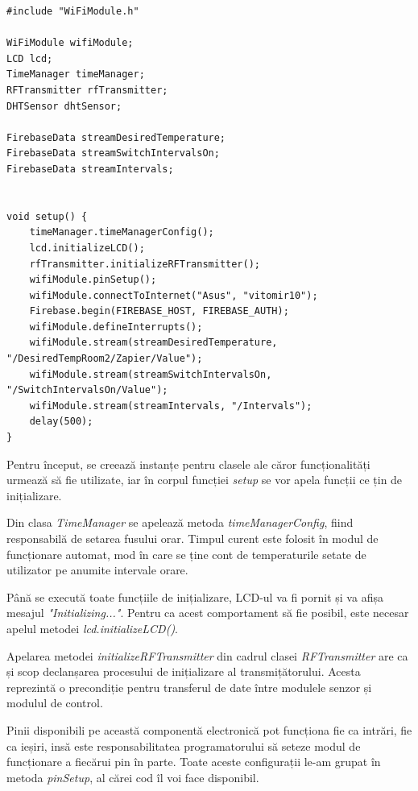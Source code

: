 \begin{lstlisting}
#include "WiFiModule.h"

WiFiModule wifiModule;
LCD lcd;
TimeManager timeManager;
RFTransmitter rfTransmitter;
DHTSensor dhtSensor;

FirebaseData streamDesiredTemperature;
FirebaseData streamSwitchIntervalsOn;
FirebaseData streamIntervals;


void setup() {
    timeManager.timeManagerConfig();
    lcd.initializeLCD();
    rfTransmitter.initializeRFTransmitter();
    wifiModule.pinSetup();
    wifiModule.connectToInternet("Asus", "vitomir10");
    Firebase.begin(FIREBASE_HOST, FIREBASE_AUTH);
    wifiModule.defineInterrupts();
    wifiModule.stream(streamDesiredTemperature, "/DesiredTempRoom2/Zapier/Value");
    wifiModule.stream(streamSwitchIntervalsOn, "/SwitchIntervalsOn/Value");  
    wifiModule.stream(streamIntervals, "/Intervals");
    delay(500);
}
\end{lstlisting}

\vspace{2em}

	Pentru început, se creează instanțe pentru clasele ale căror funcționalități urmează să fie utilizate, iar în corpul funcției \textit{setup} se vor apela funcții ce țin de inițializare.

	Din clasa \textit{TimeManager} se apelează metoda \textit{timeManagerConfig}, fiind responsabilă de setarea fusului orar. Timpul curent este folosit în modul de funcționare automat, mod în care se ține cont de temperaturile setate de utilizator pe anumite intervale orare. 

	Până se execută toate funcțiile de inițializare, LCD-ul va fi pornit și va afișa mesajul \textit{"Initializing..."}. Pentru ca acest comportament să fie posibil, este necesar apelul metodei \textit{lcd.initializeLCD()}. 	

	Apelarea metodei \textit{initializeRFTransmitter} din cadrul clasei \textit{RFTransmitter} are ca și scop declanșarea procesului de inițializare al transmițătorului. Acesta reprezintă o precondiție pentru transferul de date între modulele senzor și modulul de control.

	Pinii disponibili pe această componentă electronică pot funcționa fie ca intrări, fie ca ieșiri, insă este responsabilitatea programatorului să seteze modul de funcționare a fiecărui pin în parte. Toate aceste configurații le-am grupat în metoda \textit{pinSetup}, al cărei cod îl voi face disponibil.

\vspace{1em}

